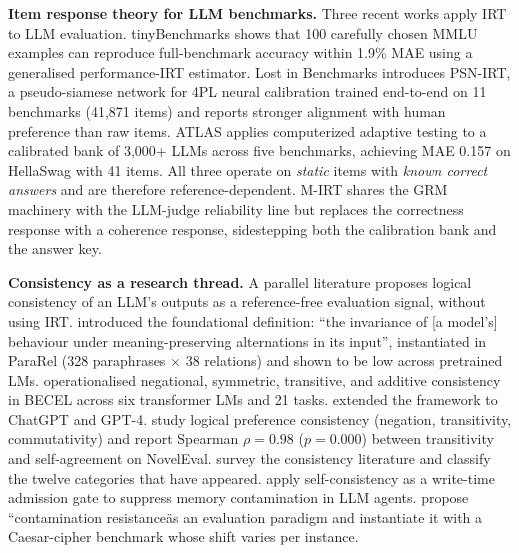 \documentclass[11pt,letterpaper]{article}
\begin{document}
\textbf{Item response theory for LLM benchmarks.} Three recent works apply IRT to LLM evaluation. tinyBenchmarks \citep{Polo2024} shows that 100 carefully chosen MMLU examples can reproduce full-benchmark accuracy within 1.9\% MAE using a generalised performance-IRT estimator. Lost in Benchmarks \citep{Zhou2025} introduces PSN-IRT, a pseudo-siamese network for 4PL neural calibration trained end-to-end on 11 benchmarks (41{,}871 items) and reports stronger alignment with human preference than raw items. ATLAS \citep{Li2025} applies computerized adaptive testing to a calibrated bank of 3{,}000+ LLMs across five benchmarks, achieving MAE 0.157 on HellaSwag with 41 items. All three operate on \emph{static} items with \emph{known correct answers} and are therefore reference-dependent. M-IRT shares the GRM machinery with the LLM-judge reliability line \citep{Choi2026} but replaces the correctness response with a coherence response, sidestepping both the calibration bank and the answer key.

\textbf{Consistency as a research thread.} A parallel literature proposes logical consistency of an LLM's outputs as a reference-free evaluation signal, without using IRT. \citet{Elazar2021} introduced the foundational definition: ``the invariance of [a model's] behaviour under meaning-preserving alternations in its input'', instantiated in ParaRel (328 paraphrases $\times$ 38 relations) and shown to be low across pretrained LMs. \citet{Jang2022} operationalised negational, symmetric, transitive, and additive consistency in BECEL across six transformer LMs and 21 tasks. \citet{Jang2023} extended the framework to ChatGPT and GPT-4. \citet{Liu2024} study logical preference consistency (negation, transitivity, commutativity) and report Spearman $\rho = 0.98$ ($p = 0.000$) between transitivity and self-agreement on NovelEval. \citet{Novikova2025} survey the consistency literature and classify the twelve categories that have appeared. \citet{Zhang2026} apply self-consistency as a write-time admission gate to suppress memory contamination in LLM agents. \citet{Musawi2025} propose ``contamination resistance\" as an evaluation paradigm and instantiate it with a Caesar-cipher benchmark whose shift varies per instance.
\end{document}
